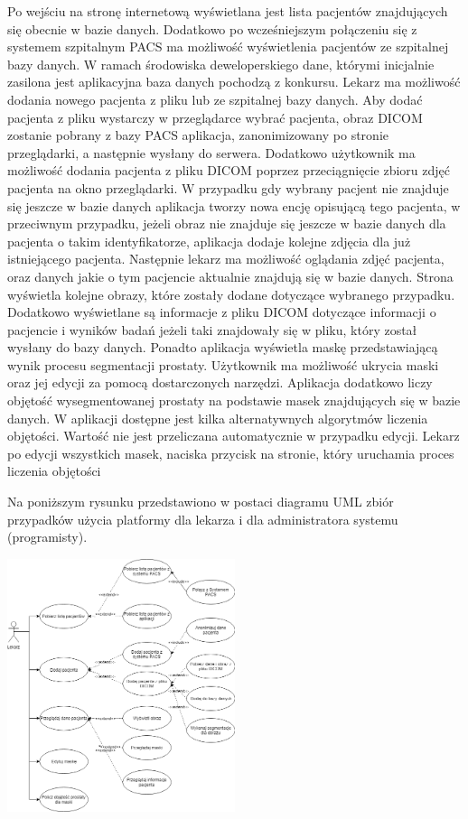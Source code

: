 \documentclass[a4paper,11pt,twoside]{report}
\theoremstyle{definition}
\begin{document}
Po wejściu na stronę internetową wyświetlana jest lista pacjentów znajdujących się obecnie w bazie danych. Dodatkowo po wcześniejszym połączeniu się z systemem szpitalnym PACS ma możliwość wyświetlenia pacjentów ze szpitalnej bazy danych. W ramach środowiska deweloperskiego dane, którymi inicjalnie zasilona jest aplikacyjna baza danych pochodzą z konkursu. \cite{konkurs}
Lekarz ma możliwość dodania nowego pacjenta z pliku lub ze szpitalnej bazy danych. Aby dodać pacjenta z pliku wystarczy w przeglądarce wybrać pacjenta, obraz DICOM zostanie pobrany z bazy PACS aplikacja, zanonimizowany po stronie przeglądarki, a następnie wysłany do serwera. Dodatkowo użytkownik ma możliwość dodania pacjenta z pliku DICOM poprzez przeciągnięcie zbioru zdjęć pacjenta na okno przeglądarki. W przypadku gdy wybrany pacjent nie znajduje się jeszcze w bazie danych aplikacja tworzy nowa encję opisującą tego pacjenta, w przeciwnym przypadku, jeżeli obraz nie znajduje się jeszcze w bazie danych dla pacjenta o takim identyfikatorze, aplikacja dodaje kolejne zdjęcia dla już istniejącego pacjenta.
Następnie lekarz ma możliwość oglądania zdjęć pacjenta, oraz danych jakie o tym pacjencie aktualnie znajdują się w bazie danych. Strona wyświetla kolejne obrazy, które zostały dodane dotyczące wybranego przypadku. Dodatkowo wyświetlane są informacje z pliku DICOM dotyczące informacji o pacjencie i wyników badań jeżeli taki znajdowały się w pliku, który  został wysłany do bazy danych. Ponadto aplikacja wyświetla maskę przedstawiającą wynik procesu segmentacji prostaty. Użytkownik ma możliwość ukrycia maski oraz jej edycji za pomocą dostarczonych narzędzi. 
Aplikacja dodatkowo liczy objętość wysegmentowanej prostaty na podstawie masek znajdujących się w bazie danych. W aplikacji dostępne jest kilka alternatywnych algorytmów liczenia objętości. Wartość nie jest przeliczana automatycznie w przypadku edycji. Lekarz po edycji wszystkich masek, naciska przycisk na stronie, który uruchamia proces liczenia objętości 
\par
Na poniższym rysunku przedstawiono w postaci diagramu UML zbiór przypadków użycia platformy dla lekarza i dla administratora systemu (programisty).
\par
\begin{minipage}{\linewidth}
	\centering
	\includegraphics[width=0.5\textwidth]{useCase.png}
\end{minipage}
\par
\end{document}
